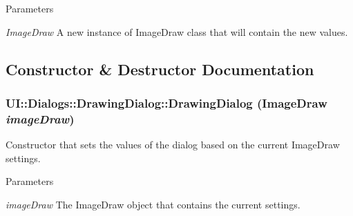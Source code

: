 \begin{DoxyParams}{Parameters}
\item[{\em ImageDraw}]A new instance of ImageDraw class that will contain the new values. \end{DoxyParams}


\subsection{Constructor \& Destructor Documentation}
\hypertarget{class_u_i_1_1_dialogs_1_1_drawing_dialog_ae813ace4331c45a149293a322e6bbbd4}{
\subsubsection[{DrawingDialog}]{\setlength{\rightskip}{0pt plus 5cm}UI::Dialogs::DrawingDialog::DrawingDialog ({\bf ImageDraw} {\em imageDraw})}}
\label{class_u_i_1_1_dialogs_1_1_drawing_dialog_ae813ace4331c45a149293a322e6bbbd4}
Constructor that sets the values of the dialog based on the current ImageDraw settings.


\begin{DoxyParams}{Parameters}
\item[{\em imageDraw}]The ImageDraw object that contains the current settings. \end{DoxyParams}


